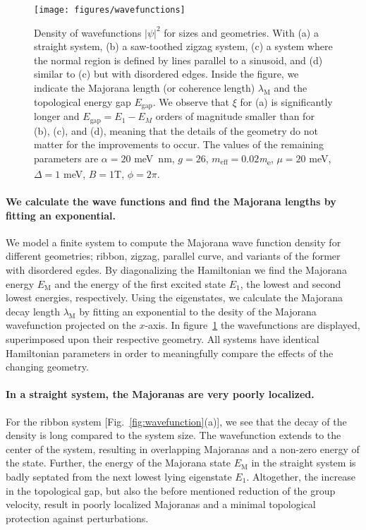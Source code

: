\documentclass[english, twocolumn, 10pt, aps, superscriptaddress, floatfix, prb, citeautoscript]{revtex4-1}
\newcommand{\meff}{m_\text{eff}}
\renewcommand{\comment}[2]{#2}
\renewcommand{\comment}{\paragraph}
\begin{document}
\begin{figure}[!htb]
\texttt{[image: figures/wavefunctions]}
\caption{Density of wavefunctions $\left|\psi\right|^2$ for sizes and geometries.
With (a) a straight system, (b) a saw-toothed zigzag system, (c) a system where the normal region is defined by lines parallel to a sinusoid, and (d) similar to (c) but with disordered edges.
Inside the figure, we indicate the Majorana length (or coherence length) $\lambda_\textrm{M}$ and the topological energy gap $E_\textrm{gap}$.
We observe that $\xi$ for (a) is significantly longer and $E_\textrm{gap} = E_\textrm{1} - E_M$ orders of magnitude smaller than for (b), (c), and (d), meaning that the details of the geometry do not matter for the improvements to occur.
The values of the remaining parameters are $\alpha=20$ \si{\milli \eV \nm}, $g=26$, $\meff=0.02$\si{\electronmass}, $\mu=20$ \si{\milli \eV}, $\Delta=1$ \si{\milli \eV}, $B=1$\si{\tesla}, $\phi=2\pi$.\label{fig:wavefunctions}}
\end{figure}

\comment{We calculate the wave functions and find the Majorana lengths by fitting an exponential.}
We model a finite system to compute the Majorana wave function density for different geometries; ribbon, zigzag, parallel curve, and variants of the former with disordered egdes.
By diagonalizing the Hamiltonian we find the Majorana energy $E_\textrm{M}$ and the energy of the first excited state $E_1$, the lowest and second lowest energies, respectively.
Using the eigenstates, we calculate the Majorana decay length $\lambda_\textrm{M}$ by fitting an exponential to the desity of the Majorana wavefunction projected on the $x$-axis.
In figure~\ref{fig:wavefunctions} the wavefunctions are displayed, superimposed upon their respective geometry.
All systems have identical Hamiltonian parameters in order to meaningfully compare the effects of the changing geometry.

\comment{In a straight system, the Majoranas are very poorly localized.}
For the ribbon system [Fig.~\ref{fig:wavefunction}(a)], we see that the decay of the density is long compared to the system size.
The wavefunction extends to the center of the system, resulting in overlapping Majoranas and a non-zero energy of the state.
Further, the energy of the Majorana state $E_\textrm{M}$ in the straight system is badly septated from the next lowest lying eigenstate $E_1$.
Altogether, the increase in the topological gap, but also the before mentioned reduction of the group velocity, result in poorly localized Majoranas and a minimal topological protection against perturbations.  %
\end{document}
